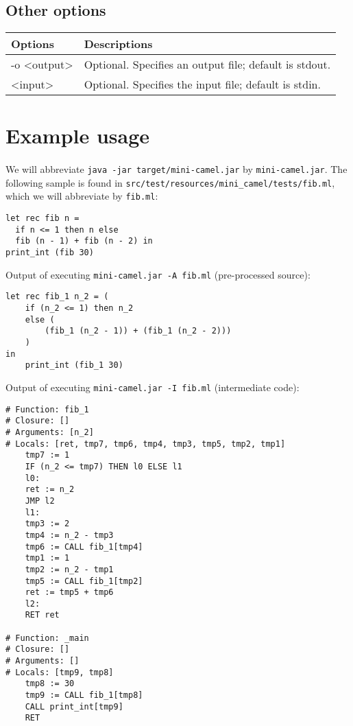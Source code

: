 \documentclass[a4paper,10pt]{article}
\begin{document}
	\subsection{Other options}
		\begin{tabular}{|R{2.3cm}|C{9cm}|}
		\hline {}Options & Descriptions \\
		\hline  -o \textless output\textgreater & Optional. Specifies an output file; default is stdout.\\
		\hline  \textless input\textgreater & Optional. Specifies the input file; default is stdin.\\
		\hline 
		\end{tabular}

\section{Example usage}
	
    \paragraph{}
    We will abbreviate \texttt{java -jar target/mini-camel.jar} by \texttt{mini-camel.jar}.
    The following sample is found in \texttt{src/test/resources/mini\_camel/tests/fib.ml},
    which we will abbreviate by \texttt{fib.ml}:
    
    \begin{lstlisting}[language=caml]
let rec fib n =
  if n <= 1 then n else
  fib (n - 1) + fib (n - 2) in
print_int (fib 30)
    \end{lstlisting}
    
    Output of executing \texttt{mini-camel.jar -A fib.ml} (pre-processed source):
    
    \begin{lstlisting}[language=caml]
let rec fib_1 n_2 = (
	if (n_2 <= 1) then n_2
	else (
    	(fib_1 (n_2 - 1)) + (fib_1 (n_2 - 2)))
	)
in
	print_int (fib_1 30)
    \end{lstlisting}
    
    Output of executing \texttt{mini-camel.jar -I fib.ml} (intermediate code):
	\begin{lstlisting}
# Function: fib_1
# Closure: []
# Arguments: [n_2]
# Locals: [ret, tmp7, tmp6, tmp4, tmp3, tmp5, tmp2, tmp1]
	tmp7 := 1
	IF (n_2 <= tmp7) THEN l0 ELSE l1
	l0:
	ret := n_2
	JMP l2
	l1:
	tmp3 := 2
	tmp4 := n_2 - tmp3
	tmp6 := CALL fib_1[tmp4]
	tmp1 := 1
	tmp2 := n_2 - tmp1
	tmp5 := CALL fib_1[tmp2]
	ret := tmp5 + tmp6
	l2:
	RET ret

# Function: _main
# Closure: []
# Arguments: []
# Locals: [tmp9, tmp8]
	tmp8 := 30
	tmp9 := CALL fib_1[tmp8]
	CALL print_int[tmp9]
	RET
\end{lstlisting}
\end{document}
